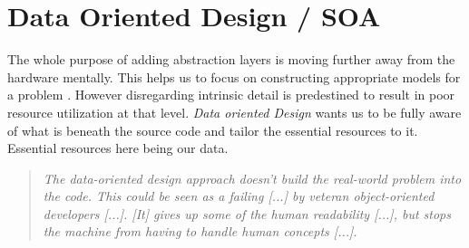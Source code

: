 \section{Data Oriented Design / SOA}\label{dod}
The whole purpose of adding abstraction layers is moving further away from the hardware mentally. This helps us to focus on constructing appropriate models for a problem . However disregarding intrinsic detail is predestined to result in poor resource utilization at that level. \textit{Data oriented Design} wants us to be fully aware of what is beneath the source code and tailor the essential resources to it. Essential resources here being our data. 
\begin{quote}
	\textit{The data-oriented design approach doesn't build the real-world problem into the code. This could be seen as a failing [...] by veteran object-oriented developers [...]. [It] gives up some of the human readability [...], but stops the machine from having to handle human concepts [...].}
\end{quote}
